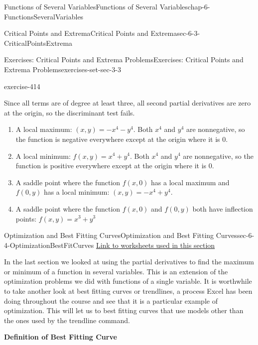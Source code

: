 \documentclass[oneside,10pt,]{book}
\newcommand{\terminology}[1]{\textbf{#1}}
\numberwithin{equation}{section}
\begin{document}
\begin{chapterptx}{Functions of Several Variables}{}{Functions of Several Variables}{}{}{chap-6-FunctionsSeveralVariables}
\begin{sectionptx}{Critical Points and Extrema}{}{Critical Points and Extrema}{}{}{sec-6-3-CriticalPointsExtrema}
\begin{exercises-subsection-numberless}{Exercises: Critical Points and Extrema Problems}{}{Exercises: Critical Points and Extrema Problems}{}{}{exercises-set-sec-3-3}
\begin{divisionexercise}{9}{}{}{exercise-414}
\par
\hypertarget{p-2432}{}%
Since all terms are of degree at least three, all second partial derivatives are zero at the origin, so the discriminant test fails.%
\leavevmode%
\begin{enumerate}[label=(\arabic*)]
\item\hypertarget{li-672}{}\hypertarget{p-2433}{}%
A local maximum: \((x,y) = -x^4-y^4\).  Both \(x^4\) and \(y^4\) are nonnegative, so the function is negative everywhere except at the origin where it is 0.%
\item\hypertarget{li-673}{}\hypertarget{p-2434}{}%
A local minimum: \(f(x,y)= x^4+y^4\).  Both \(x^4\) and \(y^4\) are nonnegative, so the function is positive everywhere except at the origin where it is 0.%
\item\hypertarget{li-674}{}\hypertarget{p-2435}{}%
A saddle point where the function \(f(x,0)\)  has a local maximum and \(f(0,y)\)  has a local minimum: \((x,y)= -x^4+y^4\).%
\item\hypertarget{li-675}{}\hypertarget{p-2436}{}%
A saddle point where the function \(f(x,0)\)  and \(f(0,y)\)  both have inflection points: \(f(x,y)= x^3+y^3\)%
\end{enumerate}
\end{divisionexercise}%
\end{exercises-subsection-numberless}
\end{sectionptx}
%
%
\typeout{************************************************}
\typeout{************************************************}
%
\begin{sectionptx}{Optimization and Best Fitting Curves}{}{Optimization and Best Fitting Curves}{}{}{sec-6-4-OptimizationBestFitCurves}
\hypertarget{p-2437}{}%
\href{./Examples/Section-6-4-Examples.xlsx}{Link to worksheets used in this section}%
\par
\hypertarget{p-2438}{}%
In the last section we looked at using the partial derivatives to find the maximum or minimum of a function in several variables.  This is an extension of the optimization problems we did with functions of a single variable.  It is worthwhile to take another look at best fitting curves or trendlines, a process Excel has been doing throughout the course and see that it is a particular example of optimization.  This will let us to best fitting curves that use models other than the ones used by the trendline command.%
\par
\hypertarget{p-2439}{}%
\terminology{Definition of Best Fitting Curve}%

\end{sectionptx}
\end{chapterptx}
\end{document}
